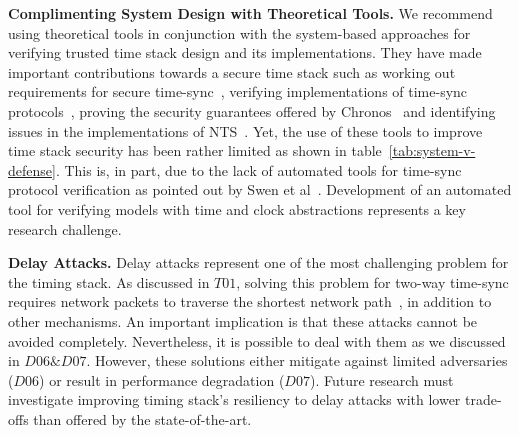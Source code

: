 \noindent\textbf{Complimenting System Design with Theoretical Tools.} We recommend using theoretical tools in conjunction with the system-based approaches for verifying trusted time stack design and its implementations. They have made important contributions towards a secure time stack such as working out requirements for secure time-sync~\cite{net-sync-gps-sec-sync}, verifying implementations of time-sync protocols~\cite{model-checking-gossip}, proving the security guarantees offered by Chronos~\cite{net-sync-chronos} and identifying issues in the implementations of NTS~\cite{theory-nts-formal-analysis}. Yet, the use of these tools to improve time stack security has been rather limited as shown in table~\ref{tab:system-v-defense}. This is, in part, due to the lack of automated tools for time-sync protocol verification as pointed out by Swen et al~\cite{net-sync-openchallenges}. Development of an automated tool for verifying models with time and clock abstractions represents a key research challenge.

\noindent\textbf{Delay Attacks.} Delay attacks represent one of the most challenging problem for the timing stack. As discussed in $T01$, solving this problem for two-way time-sync requires network packets to traverse the shortest network path~\cite{net-sync-gps-sec-sync}, in addition to other mechanisms. An important implication is that these attacks cannot be avoided completely. Nevertheless, it is possible to deal with them as we discussed in $D06 \& D07$. However, these solutions either mitigate against limited adversaries ($D06$) or result in performance degradation ($D07$). Future research must investigate improving timing stack's resiliency to delay attacks with lower trade-offs than offered by the state-of-the-art.